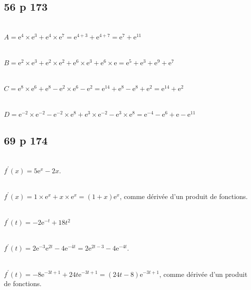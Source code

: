 \documentclass[12pt,a4paper]{book}
\begin{document}
\subsection*{56 p 173}
\begin{enumMet}
	\item {}\\
	$A=\mathrm{e}^4 \times \mathrm{e}^3+\mathrm{e}^4 \times \mathrm{e}^7=\mathrm{e}^{4+3}+\mathrm{e}^{4+7}=\mathrm{e}^7+\mathrm{e}^{11}$
	\item {}\\
	$B=\mathrm{e}^2 \times \mathrm{e}^3+\mathrm{e}^2 \times \mathrm{e}^2+\mathrm{e}^6 \times \mathrm{e}^3+\mathrm{e}^6 \times \mathrm{e}=\mathrm{e}^5+\mathrm{e}^3+\mathrm{e}^9+\mathrm{e}^7$
	\item {}\\
	$C=\mathrm{e}^8 \times \mathrm{e}^6+\mathrm{e}^8-\mathrm{e}^2 \times \mathrm{e}^6-\mathrm{e}^2=\mathrm{e}^{14}+\mathrm{e}^8-\mathrm{e}^8+\mathrm{e}^2=\mathrm{e}^{14}+\mathrm{e}^2$
	\item  {}\\
	$D=\mathrm{e}^{-2} \times \mathrm{e}^{-2}-\mathrm{e}^{-2} \times \mathrm{e}^8+\mathrm{e}^3 \times \mathrm{e}^{-2}-\mathrm{e}^3 \times \mathrm{e}^8=\mathrm{e}^{-4}-\mathrm{e}^6+\mathrm{e}-\mathrm{e}^{11}$
\end{enumMet}

\subsection*{69 p 174}
\begin{enumMet}
	\item {}\\
	$f^{\prime}(x)=5 \mathrm{e}^x-2 x$.
	\item {}\\
	$f^{\prime}(x)=1 \times \mathrm{e}^x+x \times \mathrm{e}^x=(1+x) \mathrm{e}^x$, comme dérivée d'un produit de fonctions.
	\item {}\\
	$f^{\prime}(t)=-2 \mathrm{e}^{-t}+18 t^2$
	\item {}\\
	$f^{\prime}(t)=2 \mathrm{e}^{-3} \mathrm{e}^{2 t}-4 \mathrm{e}^{-\dot{4 t}}=2 \mathrm{e}^{2 t-3}-4 \mathrm{e}^{-4 t}$.
	\item  {}\\
	$f^{\prime}(t)=-8 \mathrm{e}^{-3 t+1}+24 t \mathrm{e}^{-3 t+1}=(24 t-8) \mathrm{e}^{-3 t+1}$, comme dérivée d'un produit de fonctions.
\end{enumMet}
\end{document}
